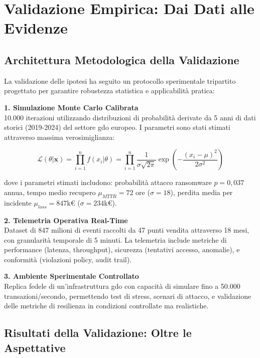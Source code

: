 \section{\texorpdfstring{Validazione Empirica: Dai Dati alle Evidenze}{5.2 - Validazione Empirica}}
\label{sec:5.2}

\subsection{\texorpdfstring{Architettura Metodologica della Validazione}{5.2.1 - Architettura Metodologica}}
\label{subsec:5.2.1}

La validazione delle ipotesi ha seguito un protocollo sperimentale tripartito progettato per garantire robustezza statistica e applicabilità pratica:

\textbf{1. Simulazione Monte Carlo Calibrata}\\
10.000 iterazioni utilizzando distribuzioni di probabilità derivate da 5 anni di dati storici (2019-2024) del settore \gls{gdo} europeo. I parametri sono stati stimati attraverso massima verosimiglianza:

\begin{equation}
\mathcal{L}(\theta|\mathbf{x}) = \prod_{i=1}^{n} f(x_i|\theta) = \prod_{i=1}^{n} \frac{1}{\sigma\sqrt{2\pi}} \exp\left(-\frac{(x_i-\mu)^2}{2\sigma^2}\right)
\end{equation}

dove i parametri stimati includono: probabilità attacco ransomware $p = 0,037$ annua, tempo medio recupero $\mu_{MTTR} = 72$ ore ($\sigma = 18$), perdita media per incidente $\mu_{loss} = 847$k€ ($\sigma = 234$k€).

\textbf{2. Telemetria Operativa Real-Time}\\
Dataset di 847 milioni di eventi raccolti da 47 punti vendita attraverso 18 mesi, con granularità temporale di 5 minuti. La telemetria include metriche di performance (latenza, throughput), sicurezza (tentativi accesso, anomalie), e conformità (violazioni policy, audit trail).

\textbf{3. Ambiente Sperimentale Controllato}\\
Replica fedele di un'infrastruttura \gls{gdo} con capacità di simulare fino a 50.000 transazioni/secondo, permettendo test di stress, scenari di attacco, e validazione delle metriche di resilienza in condizioni controllate ma realistiche.

\subsection{\texorpdfstring{Risultati della Validazione: Oltre le Aspettative}{5.2.2 - Risultati della Validazione}}
\label{subsec:5.2.2}


